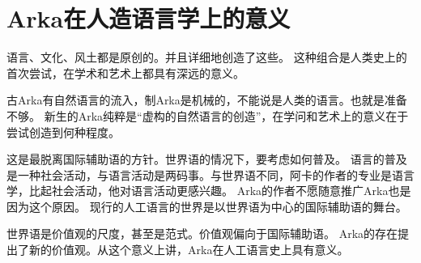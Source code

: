 \chapter[Arka在人造语言学上的意义]{Arka在人造语言学上的意义}
语言、文化、风土都是原创的。并且详细地创造了这些。
这种组合是人类史上的首次尝试，在学术和艺术上都具有深远的意义。

古Arka有自然语言的流入，制Arka是机械的，不能说是人类的语言。也就是准备不够。
新生的Arka纯粹是“虚构的自然语言的创造”，在学问和艺术上的意义在于尝试创造到何种程度。

这是最脱离国际辅助语的方针。世界语的情况下，要考虑如何普及。
语言的普及是一种社会活动，与语言活动是两码事。与世界语不同，阿卡的作者的专业是语言学，比起社会活动，他对语言活动更感兴趣。
Arka的作者不愿随意推广Arka也是因为这个原因。
现行的人工语言的世界是以世界语为中心的国际辅助语的舞台。

世界语是价值观的尺度，甚至是范式。价值观偏向于国际辅助语。
Arka的存在提出了新的价值观。从这个意义上讲，Arka在人工语言史上具有意义。
